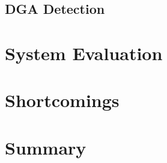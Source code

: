 

\subsection{DGA Detection} %
\label{sub:dga_detection}



\section{System Evaluation} %
\label{sec:system_evaluation}


\section{Shortcomings} %
\label{sec:shortcomings}



\section{Summary} %
\label{sec:summary}


